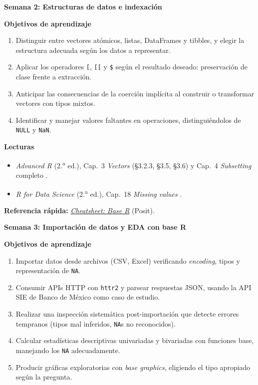 \documentclass[11pt,letterpaper]{article}
\newcommand{\semana}[2]{%
  \bigskip%
  {\color{main}\Large\bfseries Semana #1: #2\par}%
  \smallskip%
}
\newcommand{\cheatsheet}[2]{%
  \href{https://rstudio.github.io/cheatsheets/#1.pdf}{\textit{Cheatsheet: #2}}%
}
\begin{document}
\semana{2}{Estructuras de datos e indexación}

\medskip
\noindent\textbf{Objetivos de aprendizaje}
\begin{enumerate}[leftmargin=*, itemsep=1pt]
    \item Distinguir entre vectores atómicos, listas, DataFrames y tibbles, y elegir la estructura adecuada según los datos a representar.
    \item Aplicar los operadores \texttt{[}, \texttt{[[} y \texttt{\$} según el resultado deseado: preservación de clase frente a extracción.
    \item Anticipar las consecuencias de la coerción implícita al construir o transformar vectores con tipos mixtos.
    \item Identificar y manejar valores faltantes en operaciones, distinguiéndolos de \texttt{NULL} y \texttt{NaN}.
\end{enumerate}

\medskip
\noindent\textbf{Lecturas}
\begin{itemize}[leftmargin=*, itemsep=1pt]
    \item \textit{Advanced R} (2.\textsuperscript{a} ed.), Cap.\ 3 \textit{Vectors} (§3.2.3, §3.5, §3.6) y Cap.\ 4 \textit{Subsetting} completo \cite{wickham2019advr}.
    \item \textit{R for Data Science} (2.\textsuperscript{a} ed.), Cap.\ 18 \textit{Missing values} \cite{wickham2023r4ds}.
\end{itemize}

\medskip
\noindent\textbf{Referencia rápida:} \cheatsheet{base-r}{Base R} (Posit).

\semana{3}{Importación de datos y EDA con base R}

\medskip
\noindent\textbf{Objetivos de aprendizaje}
\begin{enumerate}[leftmargin=*, itemsep=1pt]
    \item Importar datos desde archivos (CSV, Excel) verificando \textit{encoding}, tipos y representación de \texttt{NA}.
    \item Consumir APIs HTTP con \texttt{httr2} y parsear respuestas JSON, usando la API SIE de Banco de México como caso de estudio.
    \item Realizar una inspección sistemática post-importación que detecte errores tempranos (tipos mal inferidos, \texttt{NA}s no reconocidos).
    \item Calcular estadísticas descriptivas univariadas y bivariadas con funciones base, manejando los \texttt{NA} adecuadamente.
    \item Producir gráficas exploratorias con \textit{base graphics}, eligiendo el tipo apropiado según la pregunta.
\end{enumerate}
\end{document}

